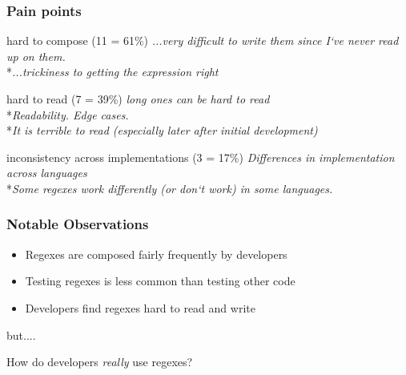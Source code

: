 \begin{frame}
\frametitle{Pain points}
\begin{block}{hard to compose (11 = 61\%)}
\emph{...very difficult to write them since I`ve never read up on them.}
\\*\emph{...trickiness to getting the expression right}
\end{block}
\begin{block}{hard to read (7 = 39\%)}
\emph{long ones can be hard to read}
\\*\emph{Readability. Edge cases.}
\\*\emph{It is terrible to read (especially later after initial development) }
\end{block}
\begin{block}{inconsistency across implementations (3 = 17\%)}
\emph{Differences in implementation across languages}
\\*\emph{Some regexes work differently (or don`t work) in some languages.}
\end{block}
\end{frame}



\begin{frame}
\frametitle{Notable Observations}

\begin{block}{}
\begin{itemize}
	\item Regexes are composed fairly frequently by developers
	\item Testing regexes is less common than testing other code
	\item Developers find regexes hard to read and write
\end{itemize}
\end{block}

but....

\begin{block}{}
How do developers \emph{really} use regexes? 
\end{block}



\end{frame}









